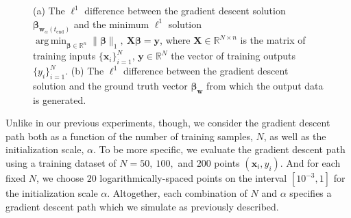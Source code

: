 \documentclass{article}
\DeclareMathOperator*{\argmin}{arg\,min}
\begin{document}
\begin{figure}[H]
    \centering
    \hfill
    \caption{(a) The $\ell^1$ difference between the gradient descent solution $\boldsymbol{\beta}_{\boldsymbol{w}_{\alpha}(t_{\text{end}})}$ and the minimum $\ell^1$ solution $\argmin_{\boldsymbol{\beta} \in \mathbb{R}^n} \| \boldsymbol{\beta} \|_1, \ \boldsymbol{X} \boldsymbol{\beta}  = \boldsymbol{y}$, where $\boldsymbol{X} \in \mathbb{R}^{N \times n}$ is the matrix of training inputs $\{ \boldsymbol{x}_i \}_{i=1}^N$, $\boldsymbol{y} \in \mathbb{R}^N$ the vector of training outputs $\{y_i\}_{i=1}^N$. (b) The $\ell^1$ difference between the gradient descent solution and the ground truth vector $\boldsymbol{\beta}_{\boldsymbol{w}}$ from which the output data is generated.}\label{fig:l1error}
\end{figure}

Unlike in our previous experiments, though, we consider the gradient descent path both as a function of the number of training samples, $N$, as well as the initialization scale, $\alpha$. To be more specific, we evaluate the gradient descent path using a training dataset of $N = 50, \ 100,$ and $200$ points $(\boldsymbol{x}_i, y_i)$. And for each fixed $N$, we choose $20$ logarithmically-spaced points on the interval $[10^{-3}, 1]$ for the initialization scale $\alpha$. Altogether, each combination of $N$ and $\alpha$ specifies a gradient descent path which we simulate as previously described.
\end{document}
